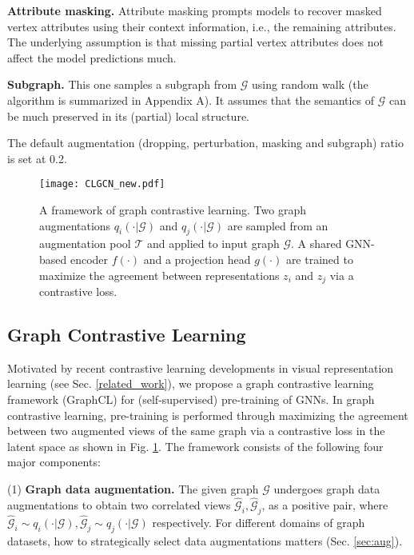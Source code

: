 \textbf{Attribute masking.}
Attribute masking prompts models to recover masked vertex attributes using their context information, i.e., the remaining attributes. The underlying assumption is that missing partial vertex attributes does not affect the model predictions much.  

\textbf{Subgraph.} This one samples a subgraph from $\mathcal{G}$ using  random walk (the algorithm is summarized in Appendix A). It assumes that the semantics of $\mathcal{G}$ can be much preserved in its (partial) local structure. 

The default augmentation (dropping, perturbation, masking and subgraph) ratio is set at 0.2. %

\begin{figure}[t] 
    \centering 
    \texttt{[image: CLGCN\_new.pdf]}
    \caption{\small{A framework of graph contrastive learning. Two graph  augmentations $q_i(\cdot | \mathcal{G})$ and $q_j(\cdot | \mathcal{G})$ are sampled from an augmentation pool $\mathcal{T}$ and applied to input graph $\mathcal{G}$. A shared GNN-based encoder $f(\cdot)$ and a projection head $g(\cdot)$ are trained to maximize the agreement between representations $z_i$ and $z_j$ via a contrastive loss.}} 
    \label{fig:graphcl} 
    \vspace{-0.5em}
\end{figure}

\subsection{Graph Contrastive Learning}
Motivated by recent contrastive learning developments in visual representation learning (see Sec. \ref{related_work}),
we propose a graph contrastive learning framework (GraphCL) for (self-supervised) pre-training of GNNs.
In graph contrastive learning, pre-training is performed through maximizing the agreement between two augmented views of the same graph via a contrastive loss in the latent space as shown in Fig. \ref{fig:graphcl}.
The framework consists of the following four major components:

(1) \textbf{Graph data augmentation.}
The given graph $\mathcal{G}$ undergoes graph data augmentations to obtain two correlated views $\hat{\mathcal{G}}_i, \hat{\mathcal{G}}_j$, as a positive pair,
where $\hat{\mathcal{G}}_i \sim q_i(\cdot | \mathcal{G}), \hat{\mathcal{G}}_j \sim q_j(\cdot | \mathcal{G})$ respectively.
For different domains of graph datasets, how to strategically select data augmentations matters (Sec. \ref{sec:aug}).

